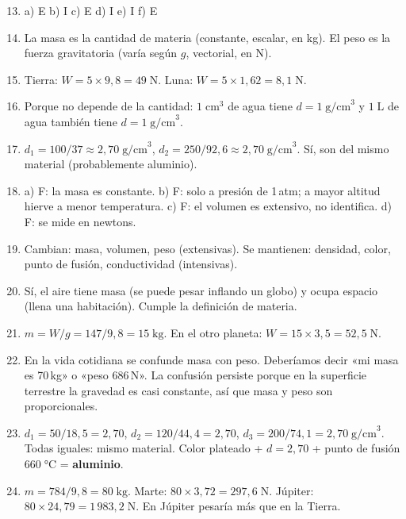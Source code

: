 \documentclass[12pt, letterpaper]{article}
\begin{document}
  \begin{enumerate}[leftmargin=*, label=\textbf{\arabic*.}]
    \setcounter{enumi}{12}
    \item a) E \quad b) I \quad c) E \quad d) I \quad e) I \quad f) E

    \item La masa es la cantidad de materia (constante, escalar, en kg). El peso es la fuerza gravitatoria (varía según $g$, vectorial, en N).

    \item Tierra: $W = 5 \times 9{,}8 = 49\;\text{N}$. Luna: $W = 5 \times 1{,}62 = 8{,}1\;\text{N}$.

    \item Porque no depende de la cantidad: $1\;\text{cm}^3$ de agua tiene $d = 1\;\text{g/cm}^3$ y $1\;\text{L}$ de agua también tiene $d = 1\;\text{g/cm}^3$.

    \item $d_1 = 100/37 \approx 2{,}70\;\text{g/cm}^3$, $d_2 = 250/92{,}6 \approx 2{,}70\;\text{g/cm}^3$. Sí, son del mismo material (probablemente aluminio).

    \item a) F: la masa es constante. b) F: solo a presión de 1\,atm; a mayor altitud hierve a menor temperatura. c) F: el volumen es extensivo, no identifica. d) F: se mide en newtons.

    \item Cambian: masa, volumen, peso (extensivas). Se mantienen: densidad, color, punto de fusión, conductividad (intensivas).

    \item Sí, el aire tiene masa (se puede pesar inflando un globo) y ocupa espacio (llena una habitación). Cumple la definición de materia.

    \item $m = W/g = 147/9{,}8 = 15\;\text{kg}$. En el otro planeta: $W = 15 \times 3{,}5 = 52{,}5\;\text{N}$.

    \item En la vida cotidiana se confunde masa con peso. Deberíamos decir «mi masa es 70\,kg» o «peso 686\,N». La confusión persiste porque en la superficie terrestre la gravedad es casi constante, así que masa y peso son proporcionales.

    \item $d_1 = 50/18{,}5 = 2{,}70$, $d_2 = 120/44{,}4 = 2{,}70$, $d_3 = 200/74{,}1 = 2{,}70\;\text{g/cm}^3$. Todas iguales: mismo material. Color plateado + $d = 2{,}70$ + punto de fusión $660\;°$C = \textbf{aluminio}.

    \item $m = 784/9{,}8 = 80\;\text{kg}$. Marte: $80 \times 3{,}72 = 297{,}6\;\text{N}$. Júpiter: $80 \times 24{,}79 = 1\,983{,}2\;\text{N}$. En Júpiter pesaría más que en la Tierra.
  \end{enumerate}
\end{document}
